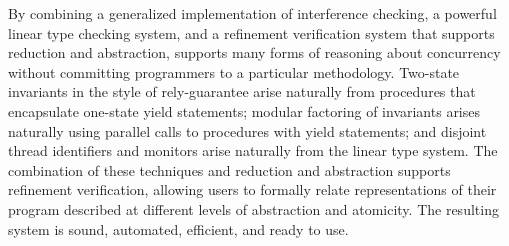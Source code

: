 By combining a generalized implementation of interference checking, a powerful linear type checking system, and a refinement verification system that supports reduction and abstraction, 
\civl supports many forms of reasoning about concurrency without committing programmers to a particular methodology.
Two-state invariants in the style of rely-guarantee arise naturally from procedures that encapsulate one-state yield statements;
modular factoring of invariants arises naturally using parallel calls to procedures with yield statements;
and disjoint thread identifiers and monitors arise naturally from the linear type system. The combination of these techniques and reduction and abstraction supports refinement verification, allowing users to formally relate representations of their program described at different levels of abstraction and atomicity. 
The resulting system is sound, automated, efficient, and ready to use.
